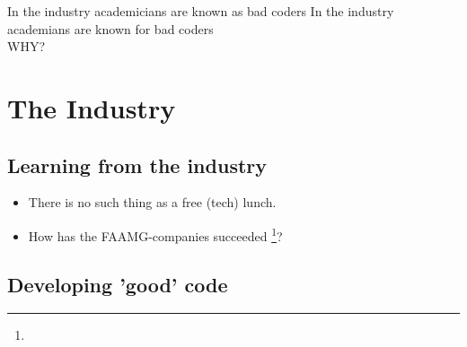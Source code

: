 \documentclass[usenames,dvipsnames]{beamer}
\theoremstyle{plain}
\theoremstyle{definition}
\begin{document}
\begin{frame}{\setframetitle{}}
{
\centering \large In the industry academicians are known as bad coders
}
{
\centering \large In the industry academians are known for bad coders
\\
\Huge \color{my_raspberry} WHY?
}
\end{frame}


\section{The Industry}
\subsection{Learning from the industry}




\begin{frame}{\setframetitle{}}

\begin{itemize}
\item There is no such thing as a free (tech) lunch.



\item How has the FAAMG-companies succeeded \footnote{}?

\end{itemize}
\end{frame}


\subsection{Developing 'good' code}
\begin{frame}{\setframetitle{}}
  {
 \begin{figure}
         {}
 \end{figure}
 }
\end{frame}
\end{document}
